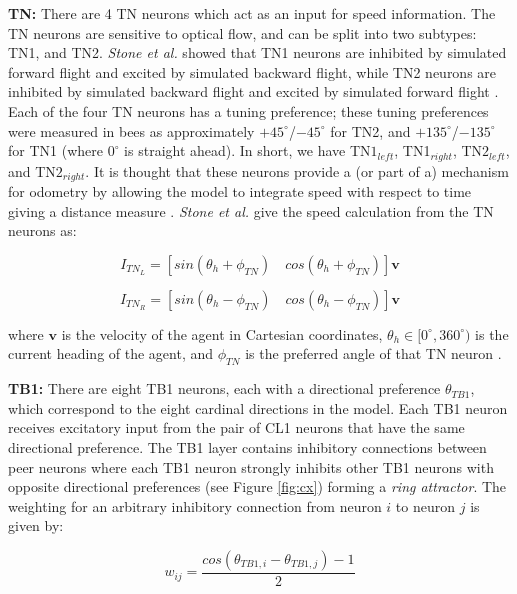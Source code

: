 \documentclass[a4paper,11pt,twoside,openright]{article}
\begin{document}
\textbf{TN:}
There are 4 TN neurons which act as an input for speed information. The TN
neurons are sensitive to optical flow, and can be split into two subtypes:
TN1, and TN2. \textit{Stone et al.} showed that TN1 neurons are inhibited by
simulated forward flight and excited by simulated backward flight, while TN2
neurons are inhibited by simulated backward flight and excited by simulated
forward flight \cite{Stone2017}. Each of the four TN neurons has a tuning
preference; these tuning preferences were measured in bees as approximately
$+45^{\circ}$/$-45^{\circ}$ for TN2, and $+135^{\circ}$/$-135^{\circ}$ for TN1
(where $0^{\circ}$ is straight ahead). In short, we have TN$1_{left}$,
TN1$_{right}$, TN$2_{left}$, and TN$2_{right}$. It is thought that these neurons
provide a (or part of a) mechanism for odometry by allowing the model to
integrate speed with respect to time giving a distance measure \cite{Stone2017}.
\textit{Stone et al.} give the speed calculation from the TN neurons
as:

\begin{equation}
  I_{TN_{L}} =
  [ sin(\theta_{h} + \phi_{TN}) \quad cos(\theta_{h} + \phi_{TN}) ]\mathbf{v}
\end{equation}

\begin{equation}
  I_{TN_{R}} =
  [ sin(\theta_{h} - \phi_{TN}) \quad cos(\theta_{h} - \phi_{TN}) ]\mathbf{v}
\end{equation}

where $\mathbf{v}$ is the velocity of the agent in Cartesian coordinates,
$\theta_h \in [0^{\circ}, 360^{\circ})$ is the current heading of the agent, and
$\phi_{TN}$ is the preferred angle of that TN neuron \cite{Stone2017}.
\newline
\par

\textbf{TB1:}
There are eight TB1 neurons, each with a directional preference $\theta_{TB1}$,
which correspond to the eight cardinal directions in the model. Each TB1 neuron
receives excitatory input from the pair of CL1 neurons that have the same
directional preference. The TB1 layer contains inhibitory connections between
peer neurons where each TB1 neuron strongly inhibits other TB1 neurons with
opposite directional preferences (see Figure \ref{fig:cx}) forming a
\textit{ring attractor}\cite{Stone2017}. The weighting for an arbitrary
inhibitory connection from neuron $i$ to neuron $j$ is given by:

\begin{equation}
  w_{ij} =
  \frac{cos(\theta_{TB1,i} - \theta_{TB1,j}) - 1}{2}
\end{equation}
\end{document}
